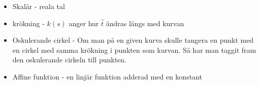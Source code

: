 \documentclass[a4paper,12pt]{article}
\begin{document}
\begin{itemize}

  \item  Skalär - reala tal

  \item  krökning - $k(s)$ anger hur $\hat{t}$ ändras längs med kurvan

  \item  Oskulerande cirkel -  Om man på en given kurva skulle tangera 
         en punkt med en cirkel med samma krökning i punkten som kurvan.
         Så har man taggit fram den oskulerande cirkeln till punkten.

  \item Affine funktion - en linjär funktion adderad med en konstant

\end{itemize}
\end{document}
